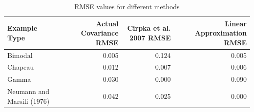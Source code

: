 \begin{table}[ht]
\captionsetup{justification=justified,singlelinecheck=false}
\centering
\caption{RMSE values for different methods}
\label{tab:rmse_methods}
\begin{tabular}{lrrr}
\toprule
              Example Type &  Actual Covariance RMSE &  Cirpka et al. 2007 RMSE &  Linear Approximation RMSE \\
\midrule
                   Bimodal &                   0.005 &                    0.124 &                      0.005 \\
                   Chapeau &                   0.012 &                    0.007 &                      0.006 \\
                     Gamma &                   0.030 &                    0.000 &                      0.090 \\
Neumann and Marsili (1976) &                   0.042 &                    0.025 &                      0.000 \\
\bottomrule
\end{tabular}
\end{table}
